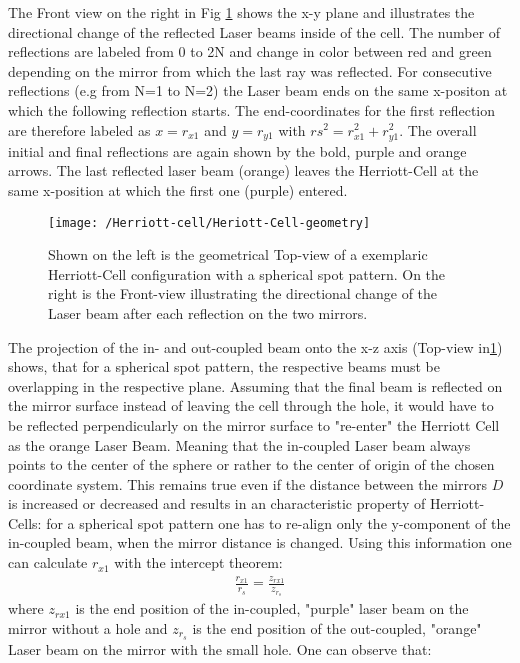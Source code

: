 The Front view on the right in Fig \ref{Figure:Heriott-cell-geometry} shows the x-y plane and illustrates the directional change of the reflected Laser beams inside of the cell. The number of reflections are labeled from 0 to 2N and change in color between red and green depending on the mirror from which the last ray was reflected. For consecutive reflections (e.g from N=1 to N=2) the Laser beam ends on the same x-positon at which the following reflection starts. The end-coordinates for the first reflection are therefore labeled as $x=r_{x1}$ and $y=r_{y1}$ with $rs^2=r_{x1}^2+r_{y1}^2$. The overall initial and final reflections are again shown by the bold, purple and orange arrows. The last reflected laser beam (orange) leaves the Herriott-Cell at the same x-position at which the first one (purple) entered. 
\begin{figure}[H]
	\centering
	\centering
	\texttt{[image: /Herriott-cell/Heriott-Cell-geometry]}
	\caption{Shown on the left is the geometrical Top-view of a exemplaric Herriott-Cell configuration with a spherical spot pattern. On the right is the Front-view illustrating the directional change of the Laser beam after each reflection on the two mirrors.}
	\label{Figure:Heriott-cell-geometry}
\end{figure}
\noindent
The projection of the in- and out-coupled beam onto the x-z axis (Top-view in\ref{Figure:Heriott-cell-geometry}) shows, that for a spherical spot pattern, the respective beams must be overlapping in the respective plane. Assuming that the final beam is reflected on the mirror surface instead of leaving the cell through the hole, it would have to be reflected perpendicularly on the mirror surface to "re-enter" the Herriott Cell as the orange Laser Beam. Meaning that the in-coupled Laser beam always points to the center of the sphere or rather to the center of origin of the chosen coordinate system. This remains true even if the distance between the mirrors $D$ is increased or decreased and results in an characteristic property of Herriott-Cells: for a spherical spot pattern one has to re-align only the y-component of the in-coupled beam, when the mirror distance is changed. Using this information one can calculate $r_{x1}$  with the intercept theorem:
\begin{align}
	\frac{r_{x1}}{r_s}=	\frac{z_{rx1}}{z_{r_s}}
	\label{eq:Herriott-Cell-1}
\end{align}
where $z_{rx1}$ is the end position of the in-coupled, "purple" laser beam on the mirror without a hole and $z_{r_s}$ is the end position of the out-coupled, "orange" Laser beam on the mirror with the small hole. One can observe that:
